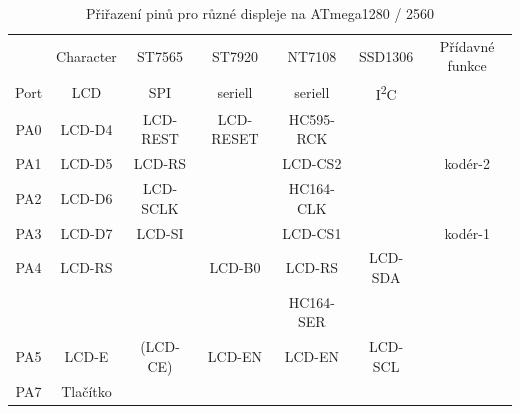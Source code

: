 \begin{table}[H]
  \begin{center}
    \begin{tabular}{| c || c | c | c | c | c | c |}
    \hline
           & Character     &  ST7565     & ST7920       & NT7108       & SSD1306     & Přídavné funkce \\
      Port & LCD           &    SPI      & seriell      & seriell      &    I\textsuperscript{2}C      & \\
    \hline
    \hline
    PA0    &  LCD-D4       &   LCD-REST  &  LCD-RESET   & HC595-RCK       &             & \\
    \hline
    PA1    &  LCD-D5       &   LCD-RS    &              & LCD-CS2        &             & kodér-2 \\
    \hline
    PA2    &  LCD-D6       &   LCD-SCLK  &              & HC164-CLK      &             & \\
    \hline
    PA3    &  LCD-D7       &   LCD-SI    &              & LCD-CS1        &             & kodér-1 \\
    \hline
    PA4    &  LCD-RS       &             &   LCD-B0     & LCD-RS         &   LCD-SDA   & \\
           &               &             &              & HC164-SER      &             & \\
    \hline
    PA5    &  LCD-E        &  (LCD-CE)   &   LCD-EN     & LCD-EN         &   LCD-SCL  & \\
    \hline
    PA7    &  Tlačítko &             &              &                &             & \\
    \hline
    \end{tabular}
  \end{center}
  \caption{Přiřazení pinů pro různé displeje na ATmega1280 / 2560}
  \label{tab:display1280}
\end{table}

